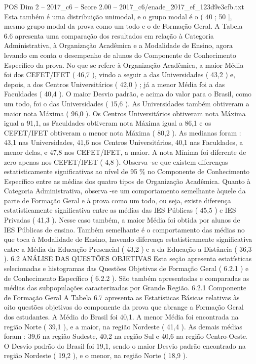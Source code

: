 \begin{textsample}{POS Dim 2 – 2017\_c6 – Score 2.00 – 2017\_c6/enade\_2017\_ef\_123d9e3cfb.txt}
Esta também é uma distribuição unimodal, e o grupo modal é o ( 40 ; 50 ], mesmo grupo modal da prova como um todo e o de Formação Geral.
A Tabela 6.6 apresenta uma comparação dos resultados em relação à Categoria Administrativa, à Organização Acadêmica e a Modalidade de Ensino, agora levando em conta o desempenho de alunos do Componente de Conhecimento Específico da prova.
No que se refere à Organização Acadêmica, a maior Média foi dos CEFET/IFET ( 46,7 ), vindo a seguir a das Universidades ( 43,2 ) e, depois, a dos Centros Universitários ( 42,0 ) ; já a menor Média foi a das Faculdades ( 40,4 ).
O maior Desvio padrão, e acima do valor para o Brasil, como um todo, foi o das Universidades ( 15,6 ).
As Universidades também obtiveram a maior nota Máxima ( 96,0 ).
Os Centros Universitários obtiveram nota Máxima igual a 91,1, as Faculdades obtiveram nota Máxima igual a 86,1 e os CEFET/IFET obtiveram a menor nota Máxima ( 80,2 ).
As medianas foram : 43,1 nas Universidades, 41,6 nos Centros Universitários, 40,1 nas Faculdades, a menor delas, e 47,8 nos CEFET/IFET, a maior.
A nota Mínima foi diferente de zero apenas nos CEFET/IFET ( 4,8 ).
Observa -se que existem diferenças estatisticamente significativas ao nível de 95 \% no Componente de Conhecimento Específico entre as médias dos quatro tipos de Organização Acadêmica.
Quanto à Categoria Administrativa, observa -se um comportamento semelhante àquele da parte de Formação Geral e à prova como um todo, ou seja, existe diferença estatisticamente significativa entre as médias das IES Públicas ( 45,5 ) e IES Privadas ( 41,3 ).
Nesse caso também, a maior Média foi obtida por alunos de IES Públicas de ensino.
Também semelhante é o comportamento das médias no que toca à Modalidade de Ensino, havendo diferença estatisticamente significativa entre a Média da Educação Presencial ( 43,2 ) e a da Educação a Distância ( 36,3 ). 6.2 ANÁLISE DAS QUESTÕES OBJETIVAS Esta seção apresenta estatísticas selecionadas e histogramas das Questões Objetivas de Formação Geral ( 6.2.1 ) e de Conhecimento Específico ( 6.2.2 ).
São também apresentadas e comparadas as médias das subpopulações caracterizadas por Grande Região. 6.2.1 Componente de Formação Geral A Tabela 6.7 apresenta as Estatísticas Básicas relativas às oito questões objetivas do componente da prova que abrange a Formação Geral dos estudantes.
A Média do Brasil foi 40,1.
A menor Média foi encontrada na região Norte ( 39,1 ), e a maior, na região Nordeste ( 41,4 ).
As demais médias foram : 39,6 na região Sudeste, 40,2 na região Sul e 40,6 na região Centro-Oeste.
O Desvio padrão do Brasil foi 19,1, sendo o maior Desvio padrão encontrado na região Nordeste ( 19,2 ), e o menor, na região Norte ( 18,9 ).

\end{textsample}
